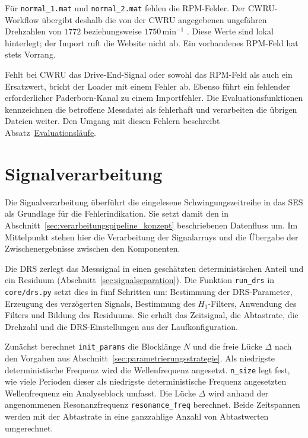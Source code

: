 Für \texttt{normal\_1.mat} und \texttt{normal\_2.mat} fehlen die RPM-Felder.
Der CWRU-Workflow übergibt deshalb die von der CWRU angegebenen
ungefähren Drehzahlen von $1772$ beziehungsweise $1750\,\mathrm{min}^{-1}$
\cite{NormalBaselineData}. Diese Werte sind lokal hinterlegt; der Import
ruft die Website nicht ab. Ein vorhandenes RPM-Feld hat stets Vorrang.

Fehlt bei CWRU das Drive-End-Signal oder sowohl das RPM-Feld als auch ein
Ersatzwert, bricht der Loader mit einem Fehler ab. Ebenso führt ein fehlender
erforderlicher Paderborn-Kanal zu einem Importfehler. Die
Evaluationsfunktionen kennzeichnen die betroffene Messdatei als fehlerhaft
und verarbeiten die übrigen Dateien weiter. Den Umgang mit diesen Fehlern
beschreibt Absatz~\hyperref[subsec:evaluationslaeufe_impl]{Evaluationsläufe}.

\section{Signalverarbeitung}
\label{sec:signalverarbeitung_impl}


Die Signalverarbeitung überführt die eingelesene Schwingungszeitreihe in
das \acrshort{SES} als Grundlage für die Fehlerindikation. Sie setzt damit den in
Abschnitt~\ref{sec:verarbeitungspipeline_konzept} beschriebenen Datenfluss
um. Im Mittelpunkt stehen hier die Verarbeitung der Signalarrays und die
Übergabe der Zwischenergebnisse zwischen den Komponenten.

\label{subsec:drs_impl}


Die DRS zerlegt das Messsignal in einen geschätzten deterministischen
Anteil und ein Residuum (Abschnitt~\ref{sec:signalseparation}).
Die Funktion \texttt{run\_drs} in \texttt{core/drs.py} setzt dies in fünf
Schritten um: Bestimmung der DRS-Parameter, Erzeugung des verzögerten
Signals, Bestimmung des
$H_1$-Filters, Anwendung des Filters und Bildung des Residuums.
Sie erhält das Zeitsignal, die Abtastrate, die Drehzahl und die
DRS-Einstellungen aus der Laufkonfiguration.

Zunächst berechnet \texttt{init\_params} die Blocklänge $N$ und
die freie Lücke $\Delta$ nach den Vorgaben aus
Abschnitt~\ref{sec:parametrierungsstrategie}. Als niedrigste
deterministische Frequenz wird die Wellenfrequenz angesetzt.
\texttt{n\_size} legt fest, wie viele Perioden dieser als niedrigste
deterministische Frequenz angesetzten Wellenfrequenz ein Analyseblock
umfasst. Die Lücke $\Delta$ wird anhand der angenommenen Resonanzfrequenz
\texttt{resonance\_freq} berechnet. Beide Zeitspannen werden mit der
Abtastrate in eine ganzzahlige Anzahl von Abtastwerten umgerechnet.

